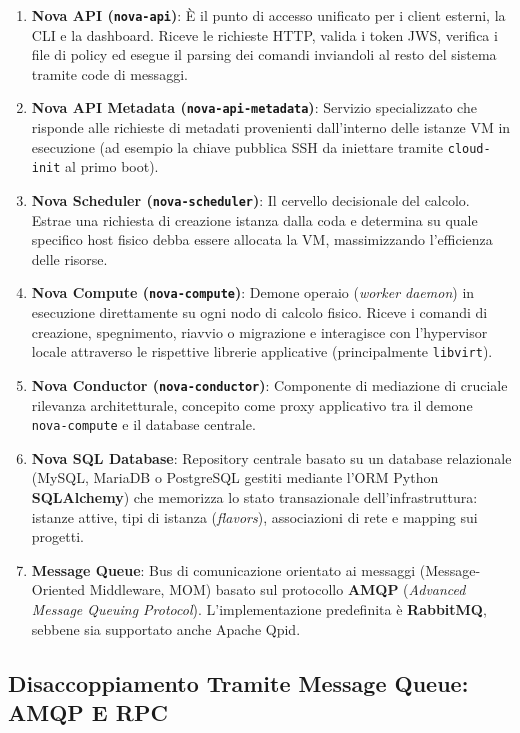 \documentclass[11pt, a4paper]{article}
\begin{document}
\begin{enumerate}
    \item \textbf{Nova API (\texttt{nova-api})}: È il punto di accesso unificato per i client esterni, la CLI e la dashboard. Riceve le richieste HTTP, valida i token JWS, verifica i file di policy ed esegue il parsing dei comandi inviandoli al resto del sistema tramite code di messaggi.
    \item \textbf{Nova API Metadata (\texttt{nova-api-metadata})}: Servizio specializzato che risponde alle richieste di metadati provenienti dall'interno delle istanze VM in esecuzione (ad esempio la chiave pubblica SSH da iniettare tramite \texttt{cloud-init} al primo boot).
    \item \textbf{Nova Scheduler (\texttt{nova-scheduler})}: Il cervello decisionale del calcolo. Estrae una richiesta di creazione istanza dalla coda e determina su quale specifico host fisico debba essere allocata la VM, massimizzando l'efficienza delle risorse.
    \item \textbf{Nova Compute (\texttt{nova-compute})}: Demone operaio (\emph{worker daemon}) in esecuzione direttamente su ogni nodo di calcolo fisico. Riceve i comandi di creazione, spegnimento, riavvio o migrazione e interagisce con l'hypervisor locale attraverso le rispettive librerie applicative (principalmente \texttt{libvirt}).
    \item \textbf{Nova Conductor (\texttt{nova-conductor})}: Componente di mediazione di cruciale rilevanza architetturale, concepito come proxy applicativo tra il demone \texttt{nova-compute} e il database centrale.
    \item \textbf{Nova SQL Database}: Repository centrale basato su un database relazionale (MySQL, MariaDB o PostgreSQL gestiti mediante l'ORM Python \textbf{SQLAlchemy}) che memorizza lo stato transazionale dell'infrastruttura: istanze attive, tipi di istanza (\emph{flavors}), associazioni di rete e mapping sui progetti.
    \item \textbf{Message Queue}: Bus di comunicazione orientato ai messaggi (Message-Oriented Middleware, MOM) basato sul protocollo \textbf{AMQP} (\emph{Advanced Message Queuing Protocol}). L'implementazione predefinita è \textbf{RabbitMQ}, sebbene sia supportato anche Apache Qpid.
\end{enumerate}

\subsection{Disaccoppiamento Tramite Message Queue: AMQP E RPC}
\end{document}
